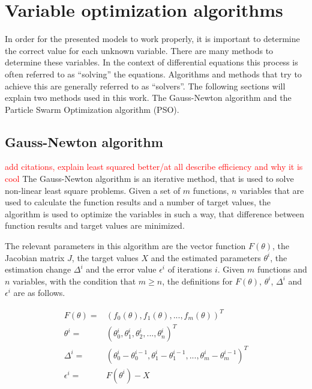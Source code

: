 
\section{Variable optimization algorithms}
In order for the presented models to work properly, it is important to determine the correct value for each unknown variable. There are many
methods to determine these variables. In the context of differential equations this process is often referred to as ``solving'' the equations.
Algorithms and methods that try to achieve this are generally referred to as ``solvers''.
The following sections will explain two methods used in this work. The Gauss-Newton algorithm and the Particle Swarm Optimization algorithm (PSO).


\subsection{Gauss-Newton algorithm}
\textcolor{red}{add citations, explain least squared better/at all}
\textcolor{red}{describe efficiency and why it is cool}
\label{sec:Gauss}
The Gauss-Newton algorithm is an iterative method, that is used to solve non-linear least square problems. Given a set of $m$ functions, $n$
variables that are used to calculate the function results  and a number of target values, the algorithm is used to optimize the variables in
such a way, that difference between function results and target values are minimized.\newline

The relevant parameters in this algorithm are the vector function $F(\theta)$, the Jacobian matrix $J$, the target values $X$ and the
estimated parameters $\theta^{i}$, the estimation change $\Delta^{i}$ and the error value $\epsilon^{i}$ of iterations $i$. Given $m$
functions and $n$ variables, with the condition that $m \geq n$, the definitions for $F(\theta)$, $\theta^{i}$, $\Delta^{i}$ and
$\epsilon^{i}$ are as follows.

\begin{align}
	F(\theta) =& (f_0(\theta), f_1(\theta),...,f_m(\theta))^T \\
	\theta^{i} =& (\theta^{i}_0, \theta^{i}_1, \theta^{i}_2,...,\theta^{i}_n)^T \\
	\Delta^{i} =& (\theta^{i}_0 - \theta^{i-1}_0, \theta^{i}_1 - \theta^{i-1}_1, ..., \theta^{i}_m - \theta^{i-1}_m)^T \\ %
	\epsilon^{i} =& F(\theta^{i}) - X
\end{align}

